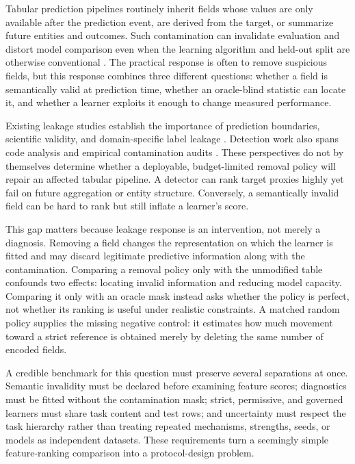 \documentclass[sigconf,review]{acmart}
\begin{document}
Tabular prediction pipelines routinely inherit fields whose values are only
available after the prediction event, are derived from the target, or summarize
future entities and outcomes. Such contamination can invalidate evaluation and
distort model comparison even when the learning algorithm and held-out split
are otherwise conventional \cite{kaufman2011leakage,kapoor2023leakage}. The
practical response is often to remove suspicious fields, but this response
combines three different questions: whether a field is semantically valid at
prediction time, whether an oracle-blind statistic can locate it, and whether a
learner exploits it enough to change measured performance.

Existing leakage studies establish the importance of prediction boundaries,
scientific validity, and domain-specific label leakage
\cite{davis2024framework,rosenblatt2024connectome}. Detection work also spans
code analysis and empirical contamination audits
\cite{subotic2022static,magar2022contamination}. These perspectives do not by
themselves determine whether a deployable, budget-limited removal policy will
repair an affected tabular pipeline. A detector can rank target proxies highly
yet fail on future aggregation or entity structure. Conversely, a semantically
invalid field can be hard to rank but still inflate a learner's score.

This gap matters because leakage response is an intervention, not merely a
diagnosis. Removing a field changes the representation on which the learner is
fitted and may discard legitimate predictive information along with the
contamination. Comparing a removal policy only with the unmodified table
confounds two effects: locating invalid information and reducing model
capacity. Comparing it only with an oracle mask instead asks whether the policy
is perfect, not whether its ranking is useful under realistic constraints. A
matched random policy supplies the missing negative control: it estimates how
much movement toward a strict reference is obtained merely by deleting the
same number of encoded fields.

A credible benchmark for this question must preserve several separations at
once. Semantic invalidity must be declared before examining feature scores;
diagnostics must be fitted without the contamination mask; strict, permissive,
and governed learners must share task content and test rows; and uncertainty
must respect the task hierarchy rather than treating repeated mechanisms,
strengths, seeds, or models as independent datasets. These requirements turn a
seemingly simple feature-ranking comparison into a protocol-design problem.
\end{document}

